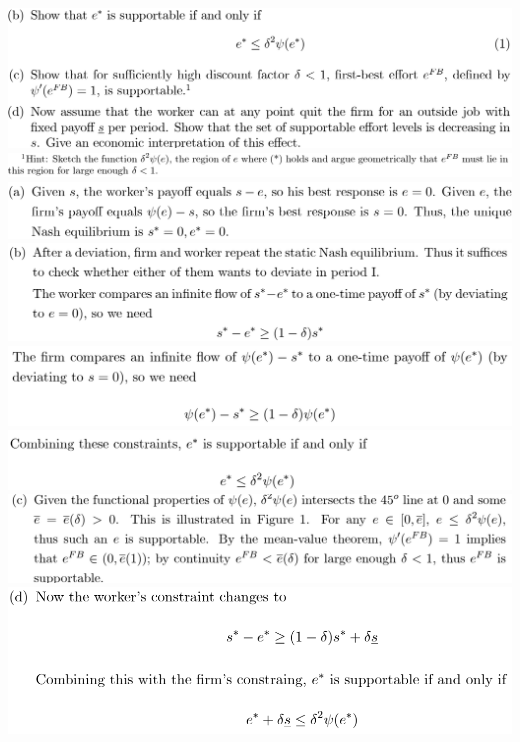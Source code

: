 \documentclass[8pt,landscape]{extarticle}
\begin{document}
\begin{multicols*}{3}
    \includegraphics[width=0.81\linewidth,keepaspectratio]{Screenshots/Screenshot 2024-03-11 133252.png}
    \includegraphics[width=0.87\linewidth,keepaspectratio]{Screenshots/Screenshot 2024-03-11 133258.png}
    \includegraphics[width=0.73\linewidth,keepaspectratio]{Screenshots/Screenshot 2024-03-11 133309.png}
    \includegraphics[width=0.74\linewidth,keepaspectratio]{Screenshots/Screenshot 2024-03-11 133319.png}
    \includegraphics[width=0.71\linewidth,keepaspectratio]{Screenshots/Screenshot 2024-03-11 133324.png}
    \includegraphics[width=0.71\linewidth,keepaspectratio]{Screenshots/Screenshot 2024-03-11 133331.png}
    \includegraphics[width=0.74\linewidth,keepaspectratio]{Screenshots/Screenshot 2024-03-11 133337.png}
    \includegraphics[width=0.66\linewidth,keepaspectratio]{Screenshots/Screenshot 2024-03-11 133346.png}

\end{multicols*}
\end{document}

